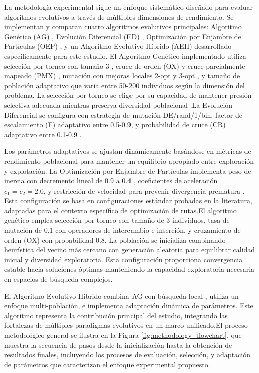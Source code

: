 \documentclass[conference]{IEEEtran}
\begin{document}
La metodología experimental sigue un enfoque sistemático diseñado para evaluar algoritmos evolutivos a través de múltiples dimensiones de rendimiento. Se implementan y comparan cuatro algoritmos evolutivos principales: Algoritmo Genético (AG) \cite{back1996}, Evolución Diferencial (ED) \cite{das2011}, Optimización por Enjambre de Partículas (OEP) \cite{clerc2002}, y un Algoritmo Evolutivo Híbrido (AEH) desarrollado específicamente para este estudio.
El Algoritmo Genético implementado utiliza selección por torneo con tamaño 3 \cite{blickle1996}, cruce de orden (OX) y cruce parcialmente mapeado (PMX) \cite{syswerda1989}, mutación con mejoras locales 2-opt y 3-opt \cite{reynolds2007}, y tamaño de población adaptativo que varía entre 50-200 individuos según la dimensión del problema. La selección por torneo se elige por su capacidad de mantener presión selectiva adecuada mientras preserva diversidad poblacional \cite{eiben2003}.La Evolución Diferencial se configura con estrategia de mutación DE/rand/1/bin, factor de escalamiento (F) adaptativo entre 0.5-0.9, y probabilidad de cruce (CR) adaptativo entre 0.1-0.9 \cite{das2011}.

Los parámetros adaptativos se ajustan dinámicamente basándose en métricas de rendimiento poblacional para mantener un equilibrio apropiado entre exploración y explotación.
La Optimización por Enjambre de Partículas implementa peso de inercia con decremento lineal de 0.9 a 0.4 \cite{clerc2002}, coeficientes de aceleración $c_1=c_2=2.0$, y restricción de velocidad para prevenir divergencia prematura \cite{pedersen2010}. Esta configuración se basa en configuraciones estándar probadas en la literatura, adaptadas para el contexto específico de optimización de rutas.El algoritmo genético emplea selección por torneo con tamaño de 3 individuos, tasa de mutación de 0.1 con operadores de intercambio e inserción, y cruzamiento de orden (OX) con probabilidad 0.8. La población se inicializa combinando heurística del vecino más cercano con generación aleatoria para equilibrar calidad inicial y diversidad exploratoria. Esta configuración proporciona convergencia estable hacia soluciones óptimas manteniendo la capacidad exploratoria necesaria en espacios de búsqueda complejos.

El Algoritmo Evolutivo Híbrido combina AG con búsqueda local \cite{voudouris2003}, utiliza un enfoque multi-población, e implementa adaptación dinámica de parámetros. Este algoritmo representa la contribución principal del estudio, integrando las fortalezas de múltiples paradigmas evolutivos en un marco unificado\cite{talbi2002}.El proceso metodológico general se ilustra en la Figura \ref{fig:methodology_flowchart}, que muestra la secuencia de pasos desde la inicialización hasta la obtención de resultados finales, incluyendo los procesos de evaluación, selección, y adaptación de parámetros que caracterizan el enfoque experimental propuesto.
\end{document}
